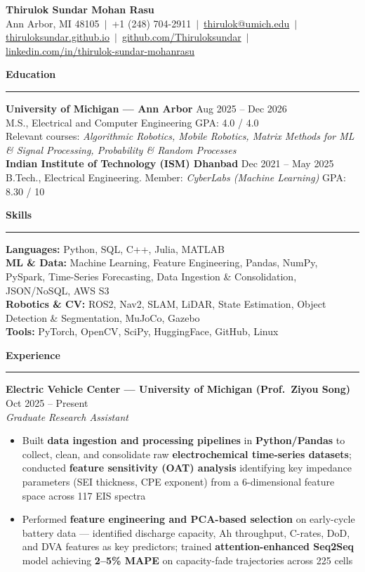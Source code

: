 \documentclass[9pt]{article}
\newcommand{\sect}[1]{\vspace{4pt}\noindent\textbf{\large #1}\vspace{3pt}\hrule\vspace{6pt}}
\begin{document}
\begin{center}
  {\Large \textbf{Thirulok Sundar Mohan Rasu}}\\[3pt]
  Ann Arbor, MI 48105 $\,|\,$ +1 (248) 704-2911 $\,|\,$
  \href{mailto:thirulok@umich.edu}{thirulok@umich.edu} $\,|\,$
  \href{https://thiruloksundar.github.io}{thiruloksundar.github.io} $\,|\,$
  \href{https://github.com/Thiruloksundar}{github.com/Thiruloksundar} $\,|\,$
  \href{https://www.linkedin.com/in/thirulok-sundar-mohanrasu/}{linkedin.com/in/thirulok-sundar-mohanrasu}
\end{center}
\vspace{-3mm}

\sect{Education}
\textbf{University of Michigan --- Ann Arbor} \hfill Aug 2025 -- Dec 2026\\
M.S., Electrical and Computer Engineering \hfill GPA: 4.0 / 4.0\\
Relevant courses: \emph{Algorithmic Robotics, Mobile Robotics, Matrix Methods for ML \& Signal Processing, Probability \& Random Processes}\\[5pt]
\textbf{Indian Institute of Technology (ISM) Dhanbad} \hfill Dec 2021 -- May 2025\\
B.Tech., Electrical Engineering. Member: \emph{CyberLabs (Machine Learning)} \hfill GPA: 8.30 / 10

\sect{Skills}
\textbf{Languages:} Python, SQL, C++, Julia, MATLAB\\
\textbf{ML \& Data:} Machine Learning, Feature Engineering, Pandas, NumPy, PySpark, Time-Series Forecasting, Data Ingestion \& Consolidation, JSON/NoSQL, AWS S3\\
\textbf{Robotics \& CV:} ROS2, Nav2, SLAM, LiDAR, State Estimation, Object Detection \& Segmentation, MuJoCo, Gazebo\\
\textbf{Tools:} PyTorch, OpenCV, SciPy, HuggingFace, GitHub, Linux

\sect{Experience}

\textbf{Electric Vehicle Center --- University of Michigan (Prof.\ Ziyou Song)} \hfill Oct 2025 -- Present\\
\emph{Graduate Research Assistant}
\vspace{-2mm}
\begin{itemize}[leftmargin=*,noitemsep,topsep=1pt]
  \item Built \textbf{data ingestion and processing pipelines} in \textbf{Python/Pandas} to collect, clean, and consolidate raw \textbf{electrochemical time-series datasets}; conducted \textbf{feature sensitivity (OAT) analysis} identifying key impedance parameters (SEI thickness, CPE exponent) from a 6-dimensional feature space across 117 EIS spectra
  \item Performed \textbf{feature engineering and PCA-based selection} on early-cycle battery data --- identified discharge capacity, Ah throughput, C-rates, DoD, and DVA features as key predictors; trained \textbf{attention-enhanced Seq2Seq} model achieving \textbf{2--5\% MAPE} on capacity-fade trajectories across 225 cells
\end{itemize}
\end{document}
